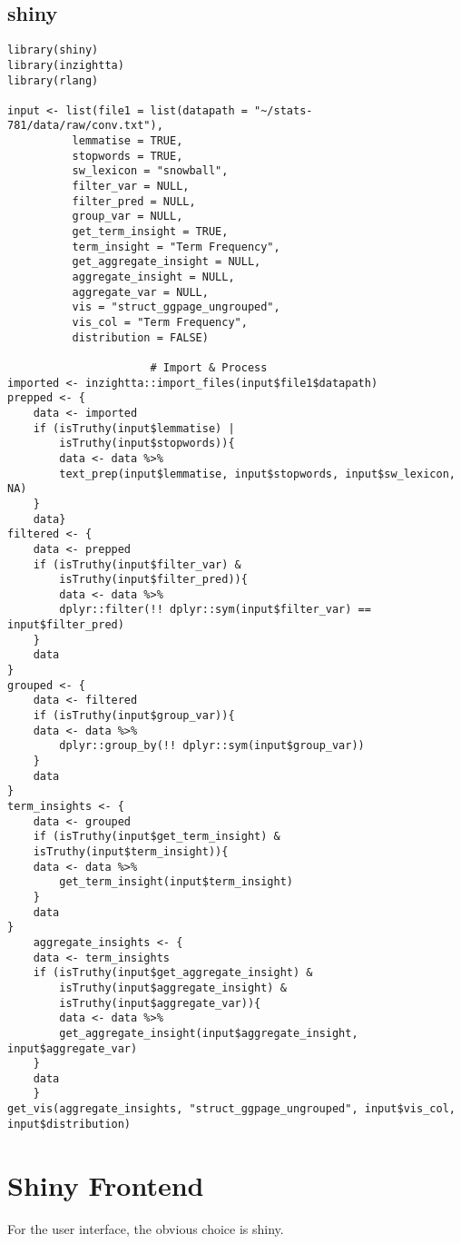 \documentclass[a4paper, 11pt]{article}
\begin{document}
\subsection{shiny}
\label{sec:org8f6a4c1}
\begin{verbatim}
library(shiny)
library(inzightta)
library(rlang)

input <- list(file1 = list(datapath = "~/stats-781/data/raw/conv.txt"),
	      lemmatise = TRUE,
	      stopwords = TRUE,
	      sw_lexicon = "snowball",
	      filter_var = NULL,
	      filter_pred = NULL,
	      group_var = NULL,
	      get_term_insight = TRUE,
	      term_insight = "Term Frequency",
	      get_aggregate_insight = NULL,
	      aggregate_insight = NULL,
	      aggregate_var = NULL,
	      vis = "struct_ggpage_ungrouped",
	      vis_col = "Term Frequency",
	      distribution = FALSE)

				      # Import & Process
imported <- inzightta::import_files(input$file1$datapath)
prepped <- {
    data <- imported
	if (isTruthy(input$lemmatise) |
	    isTruthy(input$stopwords)){
	    data <- data %>%
		text_prep(input$lemmatise, input$stopwords, input$sw_lexicon, NA)
	}
    data}
filtered <- {
    data <- prepped
	if (isTruthy(input$filter_var) &
	    isTruthy(input$filter_pred)){
	    data <- data %>%
		dplyr::filter(!! dplyr::sym(input$filter_var) == input$filter_pred)
	}
	data
}
grouped <- {
    data <- filtered
    if (isTruthy(input$group_var)){
	data <- data %>%
	    dplyr::group_by(!! dplyr::sym(input$group_var))
    }
    data
}
term_insights <- {
    data <- grouped
    if (isTruthy(input$get_term_insight) &
	isTruthy(input$term_insight)){
	data <- data %>%
	    get_term_insight(input$term_insight)
    }
    data
}
    aggregate_insights <- {
	data <- term_insights
	if (isTruthy(input$get_aggregate_insight) &
	    isTruthy(input$aggregate_insight) &
	    isTruthy(input$aggregate_var)){
	    data <- data %>%
		get_aggregate_insight(input$aggregate_insight, input$aggregate_var)
	}
	data
    }
get_vis(aggregate_insights, "struct_ggpage_ungrouped", input$vis_col, input$distribution)

\end{verbatim}
\section{Shiny Frontend}
\label{sec:org1a46e28}
For the user interface, the obvious choice is shiny.
\end{document}
